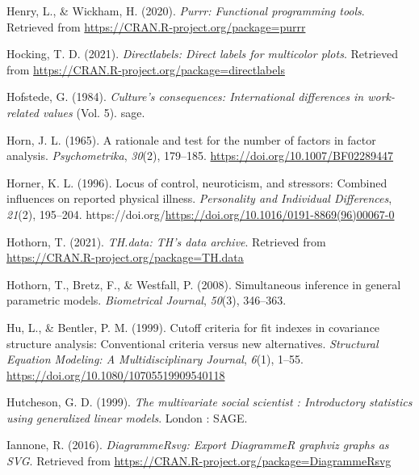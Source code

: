 \documentclass[
  man]{apa6}
\newlength{\cslhangindent}
\newlength{\cslentryspacingunit} %
\newenvironment{CSLReferences}[2] %
 {%
  \setlength{\parindent}{0pt}
  \ifodd #1
  \let\oldpar\par
  \def\par{\hangindent=\cslhangindent\oldpar}
  \fi
  \setlength{\parskip}{#2\cslentryspacingunit}
 }%
 {}
\begin{document}
\begin{CSLReferences}{1}{0}
\leavevmode{}%
Henry, L., \& Wickham, H. (2020). \emph{Purrr: Functional programming tools}. Retrieved from \url{https://CRAN.R-project.org/package=purrr}

\leavevmode{}%
Hocking, T. D. (2021). \emph{Directlabels: Direct labels for multicolor plots}. Retrieved from \url{https://CRAN.R-project.org/package=directlabels}

\leavevmode{}%
Hofstede, G. (1984). \emph{Culture's consequences: International differences in work-related values} (Vol. 5). sage.

\leavevmode{}%
Horn, J. L. (1965). A rationale and test for the number of factors in factor analysis. \emph{Psychometrika}, \emph{30}(2), 179--185. \url{https://doi.org/10.1007/BF02289447}

\leavevmode{}%
Horner, K. L. (1996). Locus of control, neuroticism, and stressors: Combined influences on reported physical illness. \emph{Personality and Individual Differences}, \emph{21}(2), 195--204. https://doi.org/\url{https://doi.org/10.1016/0191-8869(96)00067-0}

\leavevmode{}%
Hothorn, T. (2021). \emph{TH.data: TH's data archive}. Retrieved from \url{https://CRAN.R-project.org/package=TH.data}

\leavevmode{}%
Hothorn, T., Bretz, F., \& Westfall, P. (2008). Simultaneous inference in general parametric models. \emph{Biometrical Journal}, \emph{50}(3), 346--363.

\leavevmode{}%
Hu, L., \& Bentler, P. M. (1999). Cutoff criteria for fit indexes in covariance structure analysis: Conventional criteria versus new alternatives. \emph{Structural Equation Modeling: A Multidisciplinary Journal}, \emph{6}(1), 1--55. \url{https://doi.org/10.1080/10705519909540118}

\leavevmode{}%
Hutcheson, G. D. (1999). \emph{The multivariate social scientist : Introductory statistics using generalized linear models}. London : SAGE.

\leavevmode{}%
Iannone, R. (2016). \emph{DiagrammeRsvg: Export DiagrammeR graphviz graphs as SVG}. Retrieved from \url{https://CRAN.R-project.org/package=DiagrammeRsvg}


\end{CSLReferences}
\end{document}
